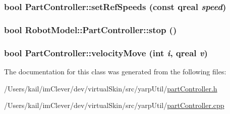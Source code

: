 \label{class_robot_model_1_1_part_controller_a5481c9f2cbbd8370fd2e5b62c38c7d2f}
\hypertarget{class_robot_model_1_1_part_controller_a3082aaf9c98045fb3309dcaef6416fbe}{
\subsubsection[{setRefSpeeds}]{\setlength{\rightskip}{0pt plus 5cm}bool PartController::setRefSpeeds (const qreal {\em speed})}}
\label{class_robot_model_1_1_part_controller_a3082aaf9c98045fb3309dcaef6416fbe}
\hypertarget{class_robot_model_1_1_part_controller_aeb479f7ffd70c0cf80beabf38b1073f7}{
\subsubsection[{stop}]{\setlength{\rightskip}{0pt plus 5cm}bool RobotModel::PartController::stop ()}}
\label{class_robot_model_1_1_part_controller_aeb479f7ffd70c0cf80beabf38b1073f7}
\hypertarget{class_robot_model_1_1_part_controller_ac5476493b51412c7b6008cf58111543b}{
\subsubsection[{velocityMove}]{\setlength{\rightskip}{0pt plus 5cm}bool PartController::velocityMove (int {\em i}, \/  qreal {\em v})}}
\label{class_robot_model_1_1_part_controller_ac5476493b51412c7b6008cf58111543b}


The documentation for this class was generated from the following files:\begin{DoxyCompactItemize}
\item 
/Users/kail/imClever/dev/virtualSkin/src/yarpUtil/\hyperlink{part_controller_8h}{partController.h}\item 
/Users/kail/imClever/dev/virtualSkin/src/yarpUtil/\hyperlink{part_controller_8cpp}{partController.cpp}\end{DoxyCompactItemize}
